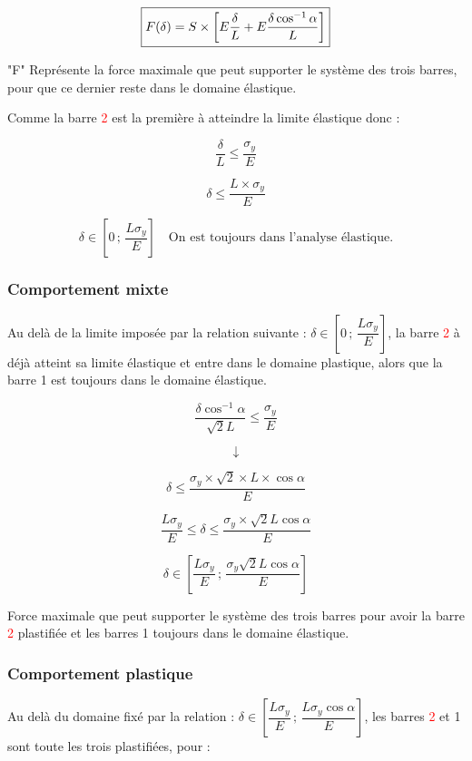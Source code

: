 \documentclass[12pt,a4paper]{report}
\renewcommand{\leq}{\leqslant}
\newcommand{\sgma}[1]{\sigma_{#1}}
\begin{document}
	\[ \fbox{$F(\delta) = S \times \left[ E\dfrac{\delta}{L}  + E\dfrac{\delta\cos^{-1}\alpha}{L} \right]$} \]
	
	
	
	"F" Représente la force maximale que peut supporter le système des trois barres, pour que ce dernier reste dans le domaine élastique.
	
	Comme la barre \textcolor{red}{2} est la première à atteindre la limite élastique donc :
	
	\[ \dfrac{\delta}{L} \leq \dfrac{\sgma{y}}{E} \]
	
	\[ \delta \leq \dfrac{L \times \sgma{y}}{E} \]
	
	\[ \delta \in \left[ 0\,;\, \dfrac{L\sgma{y}}{E} \right] \quad \text{On est toujours dans l'analyse élastique.} \]
	
	
	\subsubsection{Comportement mixte}
	
	Au delà de la limite imposée par la relation suivante : $\delta \in \left[ 0\,;\, \dfrac{L\sgma{y}}{E} \right]$, la barre \textcolor{red}{2} à déjà atteint sa limite élastique et entre dans le domaine plastique, alors que la barre 1 est toujours dans le domaine élastique.
	
	\[ \dfrac{\delta\cos^{-1}\alpha}{\sqrt{2}L} \leq \dfrac{\sgma{y}}{E} \]
	
	\[ \downarrow \]
	
	\[ \delta \leq \dfrac{\sgma{y} \times \sqrt{2} \times L \times \cos\alpha}{E} \]
	
	\vspace{3\baselineskip}
	
	\[\dfrac{L\sgma{y}}{E} \leq \delta \leq \dfrac{\sgma{y} \times \sqrt{2} L \cos\alpha}{E} \]
	

	\[ \delta \in \left[ \dfrac{L\sgma{y}}{E} \,;\, \dfrac{\sgma{y} \sqrt{2} L \cos\alpha}{E} \right] \]
	
	Force maximale que peut supporter le système des trois barres pour avoir la barre \textcolor{red}{2} plastifiée et les barres 1 toujours dans le domaine élastique.
	
	
	\subsubsection{Comportement plastique}
	
	Au delà du domaine fixé par la relation : $\delta \in \left[\dfrac{L\sgma{y}}{E} \,;\, \dfrac{L\sgma{y}\cos\alpha}{E}\right]$, les barres \textcolor{red}{2} et 1 sont toute les trois plastifiées, pour :
	
\end{document}
